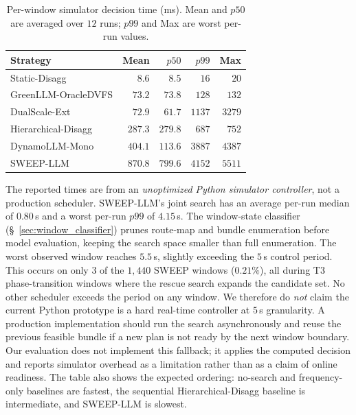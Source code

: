 \begin{table}[!t]
\centering
\caption{Per-window simulator decision time (ms). Mean and $p50$ are averaged over $12$ runs; $p99$ and Max are worst per-run values.}
\label{tab:section47_overhead}
\begin{tabular}{lrrrr}
\toprule
Strategy & Mean & $p50$ & $p99$ & Max \\
\midrule
Static-Disagg        & $8.6$    & $8.5$    & $16$    & $20$ \\
GreenLLM-OracleDVFS  & $73.2$   & $73.8$   & $128$   & $132$ \\
DualScale-Ext        & $72.9$   & $61.7$   & $1137$  & $3279$ \\
Hierarchical-Disagg  & $287.3$  & $279.8$  & $687$   & $752$ \\
DynamoLLM-Mono       & $404.1$  & $113.6$  & $3887$  & $4387$ \\
SWEEP-LLM            & $870.8$  & $799.6$  & $4152$  & $5511$ \\
\bottomrule
\end{tabular}
\end{table}

The reported times are from an \emph{unoptimized Python simulator controller}, not a production scheduler.
SWEEP-LLM's joint search has an average per-run median of $0.80$\,s and a worst per-run $p99$ of $4.15$\,s.
The window-state classifier (\S~\ref{sec:window_classifier}) prunes route-map and bundle enumeration before model evaluation, keeping the search space smaller than full enumeration.
The worst observed window reaches $5.5$\,s, slightly exceeding the $5$\,s control period.
This occurs on only $3$ of the $1{,}440$ SWEEP windows ($0.21\%$), all during T3 phase-transition windows where the rescue search expands the candidate set.
No other scheduler exceeds the period on any window.
We therefore do \emph{not} claim the current Python prototype is a hard real-time controller at $5$\,s granularity.
A production implementation should run the search asynchronously and reuse the previous feasible bundle if a new plan is not ready by the next window boundary.
Our evaluation does not implement this fallback; it applies the computed decision and reports simulator overhead as a limitation rather than as a claim of online readiness.
The table also shows the expected ordering: no-search and frequency-only baselines are fastest, the sequential Hierarchical-Disagg baseline is intermediate, and SWEEP-LLM is slowest.

